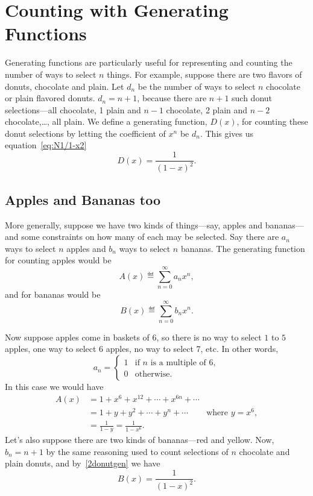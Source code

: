 \begin{problems}
\practiceproblems
{}
\end{problems}

\section{Counting with Generating Functions}\label{sec:gf_counting}
Generating functions are particularly useful for representing and
counting the number of ways to select $n$ things.  For example,
suppose there are two flavors of donuts, chocolate and plain.  Let
$d_n$ be the number of ways to select $n$ chocolate or plain flavored
donuts.  $d_n =n+1$, because there are $n+1$ such donut
selections---all chocolate, 1 plain and $n-1$ chocolate, 2 plain and
$n-2$ chocolate,\dots, all plain.  We define a generating function,
$D(x)$, for counting these donut selections by letting the coefficient
of $x^n$ be $d_n$.  This gives us equation~\eqref{eq:N1/1-x2}
\begin{equation}\label{2donutgen}
D(x) = \frac{1}{(1-x)^2}.
\end{equation}

\subsection{Apples and Bananas too}
More generally, suppose we have two kinds of things---say, apples and
bananas---and some constraints on how many of each may be selected.
Say there are $a_n$ ways to select $n$ apples and $b_n$ ways to select
$n$ bananas.  The generating function for counting apples would be
\[
A(x) \eqdef \sum_{n=0}^\infty a_nx^n,
\]
and for bananas would be
\[
B(x) \eqdef \sum_{n=0}^\infty b_nx^n.
\]

Now suppose apples come in baskets of 6, so there is no way to select
$1$ to $5$ apples, one way to select 6 apples, no way to select 7,
etc.  In other words,
\[
a_n = \begin{cases}
      1 & \text{if $n$ is a multiple of 6},\\
      0 & \text{otherwise}.
\end{cases}
\]
In this case we would have
\begin{align*}
A(x)
& = 1 + x^6 + x^{12} + \cdots + x^{6n} + \cdots\\
& = 1 + y + y^2 + \cdots +y^n + \cdots
       & \text{where $y = x^6$},\\
& = \frac{1}{1 - y} = \frac{1}{1 - x^6}.
\end{align*}
Let's also suppose there are two kinds of bananas---red and yellow.
Now, $b_n = n+1$ by the same reasoning used to count selections of $n$
chocolate and plain donuts, and by~\eqref{2donutgen} we have
\[
B(x) = \frac{1}{(1-x)^2}.
\]

